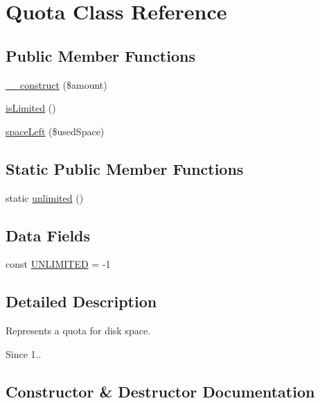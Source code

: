 \hypertarget{classorg_1_1bovigo_1_1vfs_1_1_quota}{}\section{Quota Class Reference}
\label{classorg_1_1bovigo_1_1vfs_1_1_quota}
\subsection*{Public Member Functions}
\begin{DoxyCompactItemize}
\item 
\mbox{\hyperlink{classorg_1_1bovigo_1_1vfs_1_1_quota_aa9f991a30d95d52d4557d2ddfbffbe69}{\+\_\+\+\_\+construct}} (\$amount)
\item 
\mbox{\hyperlink{classorg_1_1bovigo_1_1vfs_1_1_quota_a7414df3a1c36d91a5b2fc716d469abbb}{is\+Limited}} ()
\item 
\mbox{\hyperlink{classorg_1_1bovigo_1_1vfs_1_1_quota_a1f6bf311f89fadba1116be119e438fdb}{space\+Left}} (\$used\+Space)
\end{DoxyCompactItemize}
\subsection*{Static Public Member Functions}
\begin{DoxyCompactItemize}
\item 
static \mbox{\hyperlink{classorg_1_1bovigo_1_1vfs_1_1_quota_a1873bf81690fdbb3ca0eaf7faa08450a}{unlimited}} ()
\end{DoxyCompactItemize}
\subsection*{Data Fields}
\begin{DoxyCompactItemize}
\item 
const \mbox{\hyperlink{classorg_1_1bovigo_1_1vfs_1_1_quota_af1c43c06d3e15c94050ef7e233971357}{U\+N\+L\+I\+M\+I\+T\+ED}} = -\/1
\end{DoxyCompactItemize}


\subsection{Detailed Description}
Represents a quota for disk space.

\begin{DoxySince}{Since}
1.. 
\end{DoxySince}


\subsection{Constructor \& Destructor Documentation}
\mbox{\label{classorg_1_1bovigo_1_1vfs_1_1_quota_aa9f991a30d95d52d4557d2ddfbffbe69}} 
